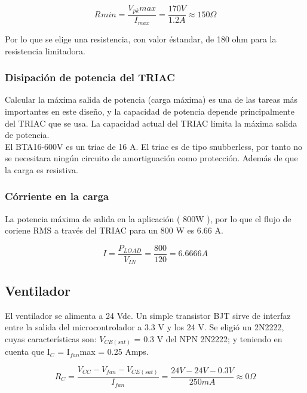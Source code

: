         \begin{equation}
            R_{ }min   
            =   \frac { V_{pk}max } { I_{max} }    
            =   \frac { 170V } { 1.2A } \approx 150\Omega
        \end{equation}
        
        Por lo que se elige una resistencia, con valor éstandar, de 180 ohm para la resistencia limitadora.
        
    \subsubsection*{Disipación de potencia del TRIAC}
    Calcular la máxima salida de potencia (carga máxima) es una de las tareas más importantes en este diseño, y la capacidad de potencia depende principalmente del TRIAC que se usa. La capacidad actual del TRIAC limita la máxima salida de potencia.\\
    
    El BTA16-600V es un triac de 16 A. El triac es de tipo snubberless, por tanto no se necesitara ningún circuito de amortiguación como protección. Además de que la carga es resistiva. 
    
        \subsubsection*{Córriente en la carga}
        La potencia máxima de salida en la aplicación ( 800W ), por lo que el flujo de coriene RMS a través del TRIAC para un 800 W es 6.66 A.

            \begin{equation}
                I   
                =   \frac{ P_{LOAD} }{ V_{IN} }  
                =   \frac{800}{120}    
                =   6.6666 A
            \end{equation}

        
\subsection{Ventilador}
    El ventilador se alimenta a 24 Vdc. Un simple transistor BJT sirve de interfaz entre la salida del microcontrolador a 3.3 V y los 24 V. Se eligió un 2N2222, cuyas características son: $V_{CE(sat)}$ = 0.3 V del NPN 2N2222; y teniendo en cuenta que I$_{C}$ = I$_{fan}$max = 0.25 Amps.
    
    \begin{equation}
        R_{C} 
        =   \frac { V_{CC} - V_{fan} - V_{CE(sat)} } { I_{fan} }
        =   \frac { 24V - 24V - 0.3V } { 250 mA }
        \approx   0 \Omega
    \end{equation}
    
